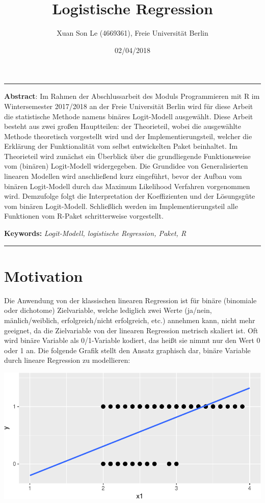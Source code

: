 \documentclass[12pt,]{article}
\title{\textbf{Logistische Regression}}
\author{Xuan Son Le (4669361), Freie Universität Berlin}
\date{02/04/2018}
\begin{document}
\maketitle

\begin{center}\rule{0.5\linewidth}{\linethickness}\end{center}

\textbf{Abstract}: Im Rahmen der Abschlussarbeit des Moduls
Programmieren mit R im Wintersemester 2017/2018 an der Freie Universität
Berlin wird für diese Arbeit die statistische Methode namens binäres
Logit-Modell ausgewählt. Diese Arbeit besteht aus zwei großen
Hauptteilen: der Theorieteil, wobei die ausgewählte Methode theoretisch
vorgestellt wird und der Implementierungsteil, welcher die Erklärung der
Funktionalität vom selbst entwickelten Paket beinhaltet. Im Theorieteil
wird zunächst ein Überblick über die grundliegende Funktionsweise vom
(binären) Logit-Modell widergegeben. Die Grundidee von Generalisierten
linearen Modellen wird anschließend kurz eingeführt, bevor der Aufbau
vom binären Logit-Modell durch das Maximum Likelihood Verfahren
vorgenommen wird. Demzufolge folgt die Interpretation der Koeffizienten
und der Lösungsgüte vom binären Logit-Modell. Schließlich werden im
Implementierungsteil alle Funktionen vom R-Paket schritterweise
vorgestellt.

\textbf{Keywords:} \emph{Logit-Modell, logistische Regression, Paket, R}

\begin{center}\rule{0.5\linewidth}{\linethickness}\end{center}

\newpage

\section{Motivation}\label{motivation}

Die Anwendung von der klassischen linearen Regression ist für binäre
(binomiale oder dichotome) Zielvariable, welche lediglich zwei Werte
(ja/nein, mänlich/weiblich, erfolgreich/nicht erfolgreich, etc.)
annehmen kann, nicht mehr geeignet, da die Zielvariable von der linearen
Regression metrisch skaliert ist. Oft wird binäre Variable als
0/1-Variable kodiert, das heißt sie nimmt nur den Wert 0 oder 1 an. Die
folgende Grafik stellt den Ansatz graphisch dar, binäre Variable durch
lineare Regression zu modellieren:

\includegraphics{logisticRegression_files/figure-latex/unnamed-chunk-1-1.pdf}
\end{document}
